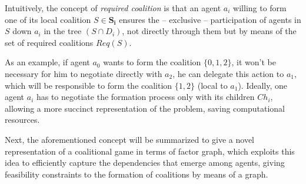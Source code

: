 \documentclass[11pt, twoside, titlepage, a4paper, openright]{report}
\begin{document}
\noindent Intuitively, the concept of \textit{required coalition} is that an agent $a_i$ willing to form one of its local coalition $S\in\mathbf{S_i}$ ensures the -- exclusive -- participation of agents in $S$ down $a_i$ in the tree $(S \cap D_i)$, not directly through them but by means of the set of required coalitions $Req(S)$.

\noindent As an example, if agent $a_0$ wants to form the coalition $\{0,1,2\}$, it won't be necessary for him to negotiate directly with $a_2$, he can delegate this action to $a_1$, which will be responsible to form the coalition $\{1,2\}$ (local to $a_1$).
Ideally, one agent $a_i$ has to negotiate the formation process only with its children $Ch_i$, allowing a more succinct representation of the problem, saving computational resources.

Next, the aforementioned concept will be summarized to give a novel representation of a coalitional game in terms of factor graph, which exploits this idea to efficiently capture the dependencies that emerge among agents, giving feasibility constraints to the formation of coalitions by means of a graph.
\end{document}
